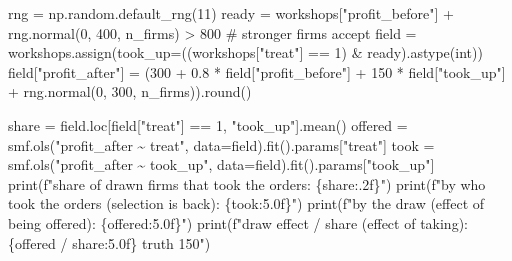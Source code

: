 \documentclass[
  letterpaper,
  10pt,
  twoside,
  openright,
  numbers=noenddot,
  chapterprefix=true]{scrbook}
\newenvironment{Shaded}{}{}
\newcommand{\BuiltInTok}[1]{\textcolor[rgb]{0.84,0.23,0.29}{#1}}
\newcommand{\CommentTok}[1]{\textcolor[rgb]{0.42,0.45,0.49}{#1}}
\newcommand{\DecValTok}[1]{\textcolor[rgb]{0.00,0.36,0.77}{#1}}
\newcommand{\FloatTok}[1]{\textcolor[rgb]{0.00,0.36,0.77}{#1}}
\newcommand{\NormalTok}[1]{\textcolor[rgb]{0.14,0.16,0.18}{#1}}
\newcommand{\OperatorTok}[1]{\textcolor[rgb]{0.14,0.16,0.18}{#1}}
\newcommand{\SpecialCharTok}[1]{\textcolor[rgb]{0.00,0.36,0.77}{#1}}
\newcommand{\SpecialStringTok}[1]{\textcolor[rgb]{0.01,0.18,0.38}{#1}}
\newcommand{\StringTok}[1]{\textcolor[rgb]{0.01,0.18,0.38}{#1}}
\begin{document}
\label{check-trial-takeup}
\begin{Shaded}
\begin{Highlighting}[]
\NormalTok{rng }\OperatorTok{=}\NormalTok{ np.random.default\_rng(}\DecValTok{11}\NormalTok{)}
\NormalTok{ready }\OperatorTok{=}\NormalTok{ workshops[}\StringTok{"profit\_before"}\NormalTok{] }\OperatorTok{+}\NormalTok{ rng.normal(}\DecValTok{0}\NormalTok{, }\DecValTok{400}\NormalTok{, n\_firms) }\OperatorTok{\textgreater{}} \DecValTok{800}     \CommentTok{\# stronger firms accept}
\NormalTok{field }\OperatorTok{=}\NormalTok{ workshops.assign(took\_up}\OperatorTok{=}\NormalTok{((workshops[}\StringTok{"treat"}\NormalTok{] }\OperatorTok{==} \DecValTok{1}\NormalTok{) }\OperatorTok{\&}\NormalTok{ ready).astype(}\BuiltInTok{int}\NormalTok{))}
\NormalTok{field[}\StringTok{"profit\_after"}\NormalTok{] }\OperatorTok{=}\NormalTok{ (}\DecValTok{300} \OperatorTok{+} \FloatTok{0.8} \OperatorTok{*}\NormalTok{ field[}\StringTok{"profit\_before"}\NormalTok{] }\OperatorTok{+} \DecValTok{150} \OperatorTok{*}\NormalTok{ field[}\StringTok{"took\_up"}\NormalTok{]}
                         \OperatorTok{+}\NormalTok{ rng.normal(}\DecValTok{0}\NormalTok{, }\DecValTok{300}\NormalTok{, n\_firms)).}\BuiltInTok{round}\NormalTok{()}

\NormalTok{share }\OperatorTok{=}\NormalTok{ field.loc[field[}\StringTok{"treat"}\NormalTok{] }\OperatorTok{==} \DecValTok{1}\NormalTok{, }\StringTok{"took\_up"}\NormalTok{].mean()}
\NormalTok{offered }\OperatorTok{=}\NormalTok{ smf.ols(}\StringTok{"profit\_after \textasciitilde{} treat"}\NormalTok{, data}\OperatorTok{=}\NormalTok{field).fit().params[}\StringTok{"treat"}\NormalTok{]}
\NormalTok{took }\OperatorTok{=}\NormalTok{ smf.ols(}\StringTok{"profit\_after \textasciitilde{} took\_up"}\NormalTok{, data}\OperatorTok{=}\NormalTok{field).fit().params[}\StringTok{"took\_up"}\NormalTok{]}
\BuiltInTok{print}\NormalTok{(}\SpecialStringTok{f"share of drawn firms that took the orders:  }\SpecialCharTok{\{}\NormalTok{share}\SpecialCharTok{:.2f\}}\SpecialStringTok{"}\NormalTok{)}
\BuiltInTok{print}\NormalTok{(}\SpecialStringTok{f"by who took the orders (selection is back): }\SpecialCharTok{\{}\NormalTok{took}\SpecialCharTok{:5.0f\}}\SpecialStringTok{"}\NormalTok{)}
\BuiltInTok{print}\NormalTok{(}\SpecialStringTok{f"by the draw (effect of being offered):      }\SpecialCharTok{\{}\NormalTok{offered}\SpecialCharTok{:5.0f\}}\SpecialStringTok{"}\NormalTok{)}
\BuiltInTok{print}\NormalTok{(}\SpecialStringTok{f"draw effect / share (effect of taking):     }\SpecialCharTok{\{}\NormalTok{offered }\OperatorTok{/}\NormalTok{ share}\SpecialCharTok{:5.0f\}}\SpecialStringTok{   truth 150"}\NormalTok{)}
\end{Highlighting}
\end{Shaded}
\end{document}
